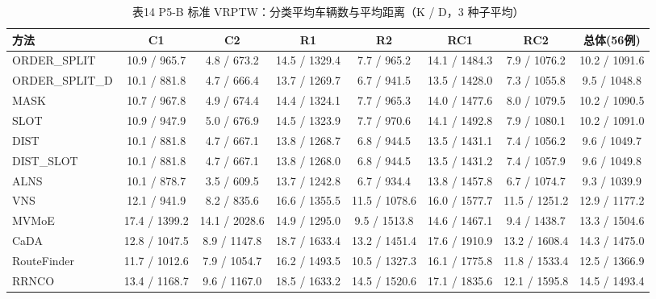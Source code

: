 \begin{table}[htbp]
\centering
\caption{表14 P5-B 标准 VRPTW：分类平均车辆数与平均距离（K / D，3 种子平均）}
\label{tab:p5_14}
\begin{tabular}{lccccccc}
\toprule
方法 & C1 & C2 & R1 & R2 & RC1 & RC2 & 总体(56例) \\
\midrule
ORDER_SPLIT & 10.9 / 965.7 & 4.8 / 673.2 & 14.5 / 1329.4 & 7.7 / 965.2 & 14.1 / 1484.3 & 7.9 / 1076.2 & 10.2 / 1091.6 \\
ORDER_SPLIT_D & 10.1 / 881.8 & 4.7 / 666.4 & 13.7 / 1269.7 & 6.7 / 941.5 & 13.5 / 1428.0 & 7.3 / 1055.8 & 9.5 / 1048.8 \\
MASK & 10.7 / 967.8 & 4.9 / 674.4 & 14.4 / 1324.1 & 7.7 / 965.3 & 14.0 / 1477.6 & 8.0 / 1079.5 & 10.2 / 1090.5 \\
SLOT & 10.9 / 947.9 & 5.0 / 676.9 & 14.5 / 1323.9 & 7.7 / 970.6 & 14.1 / 1492.8 & 7.9 / 1080.1 & 10.2 / 1091.0 \\
DIST & 10.1 / 881.8 & 4.7 / 667.1 & 13.8 / 1268.7 & 6.8 / 944.5 & 13.5 / 1431.1 & 7.4 / 1056.2 & 9.6 / 1049.7 \\
DIST_SLOT & 10.1 / 881.8 & 4.7 / 667.1 & 13.8 / 1268.0 & 6.8 / 944.5 & 13.5 / 1431.2 & 7.4 / 1057.9 & 9.6 / 1049.8 \\
ALNS & 10.1 / 878.7 & 3.5 / 609.5 & 13.7 / 1242.8 & 6.7 / 934.4 & 13.8 / 1457.8 & 6.7 / 1074.7 & 9.3 / 1039.9 \\
VNS & 12.1 / 941.9 & 8.2 / 835.6 & 16.6 / 1355.5 & 11.5 / 1078.6 & 16.0 / 1577.7 & 11.5 / 1251.2 & 12.9 / 1177.2 \\
MVMoE & 17.4 / 1399.2 & 14.1 / 2028.6 & 14.9 / 1295.0 & 9.5 / 1513.8 & 14.6 / 1467.1 & 9.4 / 1438.7 & 13.3 / 1504.6 \\
CaDA & 12.8 / 1047.5 & 8.9 / 1147.8 & 18.7 / 1633.4 & 13.2 / 1451.4 & 17.6 / 1910.9 & 13.2 / 1608.4 & 14.3 / 1475.0 \\
RouteFinder & 11.7 / 1012.6 & 7.9 / 1054.7 & 16.2 / 1493.5 & 10.5 / 1327.3 & 16.1 / 1775.8 & 11.8 / 1533.4 & 12.5 / 1366.9 \\
RRNCO & 13.4 / 1168.7 & 9.6 / 1167.0 & 18.5 / 1633.2 & 14.5 / 1520.6 & 17.1 / 1835.6 & 12.1 / 1595.8 & 14.5 / 1493.4 \\
\bottomrule
\end{tabular}
\end{table}
